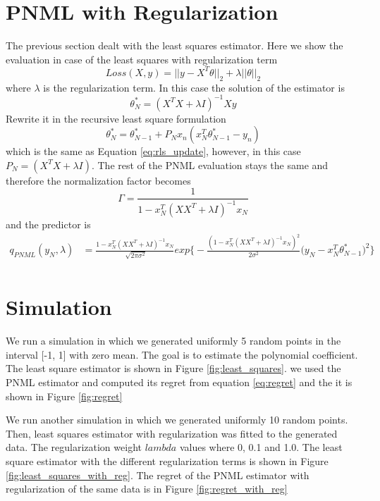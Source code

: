 \documentclass[letterpaper, 10 pt, conference]{ieeeconf}  %
\begin{document}
\section{PNML with Regularization} \label{sec:PNMLwithReg}
The previous section dealt with the least squares estimator. Here we show the evaluation in case of the least squares with regularization term
\begin{equation}
Loss(X,y)= ||y-X^T \theta||_2 + \lambda ||\theta||_2
\end{equation}
where $\lambda$ is the regularization term.
In this case the solution of the estimator is
\begin{equation}
\theta ^*_N = (X^T X+ \lambda I)^{-1} X y
\end{equation}
Rewrite it in the recursive least square formulation 
\begin{equation}
\theta ^*_N=\theta^*_{N-1} + P_N x_n (x_N^T \theta^*_{N-1} - y_n)
\end{equation}
which is the same as Equation \ref{eq:rls_update}, however, in this case $P_N= (X^T X+ \lambda I)$. The rest of the PNML evaluation stays the same and therefore the normalization factor becomes
\begin{equation}
\Gamma =\frac{1}{1 - x_N^T (XX^T+ \lambda I)^{-1} x_N } 
\end{equation}
and the predictor is 
\begin{equation}
\begin{split}
q_{PNML}(y_N, \lambda)
&=\frac{1 - x_N^T (XX^T + \lambda I)^{-1} x_N }{\sqrt[]{2\pi\sigma^2}}
exp\bigg\{-\frac{(1 - x_N^T (XX^T + \lambda I)^{-1} x_N )^2 }{2\sigma^2}\bigg(y_N-x_N^T \theta^*_{N-1} \bigg)^2\bigg\} \\
\end{split}
\end{equation}

\section{Simulation} \label{sec:Simulation}
We run a simulation in which we generated uniformly 5 random points in the interval [-1, 1] with zero mean. The goal is to estimate the polynomial coefficient. The least square estimator is shown in Figure \ref{fig:least_squares}. we used the PNML estimator and computed its regret from equation \ref{eq:regret} and the it is shown in Figure \ref{fig:regret} 

We run another simulation in which we generated uniformly 10 random points. Then, least squares estimator with regularization was fitted to the generated data. The regularization weight $lambda$ values where 0, 0.1 and 1.0. The least square estimator with the different regularization terms is shown in Figure \ref{fig:least_squares_with_reg}. The regret of the PNML estimator with regularization of the same data is in Figure \ref{fig:regret_with_reg} 
\end{document}
